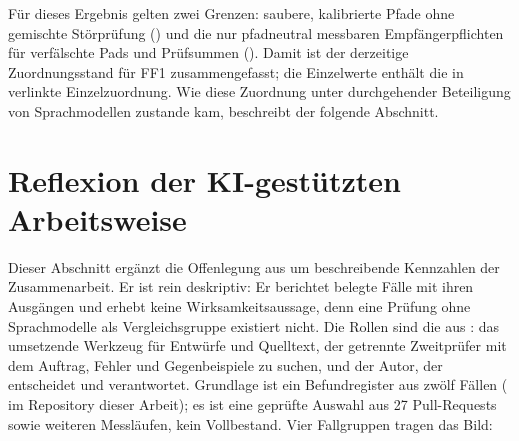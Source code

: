 Für dieses Ergebnis gelten zwei Grenzen: saubere, kalibrierte Pfade ohne gemischte Störprüfung
() und die nur pfadneutral messbaren Empfängerpflichten für verfälschte Pads und
Prüfsummen ().
Damit ist der derzeitige Zuordnungs\-stand für FF1 zusammengefasst; die Einzelwerte enthält die in
 verlinkte Einzelzuordnung. Wie diese Zuordnung unter durchgehender
Beteiligung von Sprachmodellen zustande kam, beschreibt der folgende Abschnitt.

\section{Reflexion der KI-gestützten Arbeitsweise}
\label{sec:ki-reflexion}

Dieser Abschnitt ergänzt die Offenlegung aus  um beschreibende Kennzahlen der
Zusammenarbeit. Er ist rein deskriptiv: Er berichtet belegte Fälle mit ihren Ausgängen und erhebt
keine Wirksamkeitsaussage, denn eine Prüfung ohne Sprachmodelle als Vergleichsgruppe existiert nicht.
Die Rollen sind die aus : das umsetzende Werkzeug für Entwürfe und Quelltext, der
getrennte Zweit\-prüfer mit dem Auftrag, Fehler und Gegenbeispiele zu suchen, und der Autor, der
entscheidet und verantwortet. Grundlage ist ein Befundregister aus zwölf Fällen
( im Repository dieser Arbeit); es ist eine geprüfte Auswahl aus
27 Pull-Requests sowie weiteren Messläufen, kein Vollbestand. Vier Fallgruppen tragen das Bild:

